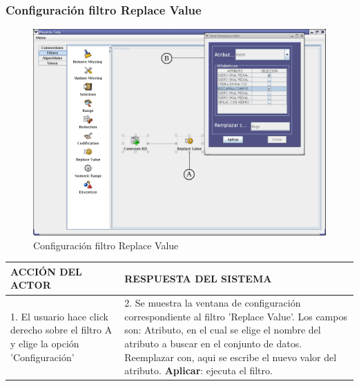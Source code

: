 \subsubsection{Configuraci\'on filtro Replace Value}
\begin{figure}[ht]
\centering
\includegraphics[width=1\textwidth]{images/fi7.png}
\caption{Configuraci\'on filtro Replace Value}
\end{figure}
\begin{center}
\begin{tabular}{|p{60mm}|p{60mm}|} \hline
ACCI\'ON DEL ACTOR & RESPUESTA DEL SISTEMA \\ \hline
1. El usuario hace click derecho sobre el filtro A y elige la opci\'on 'Configuraci\'on'& 2. Se muestra la ventana de configuraci\'on correspondiente al filtro 'Replace Value'. Los campos son: Atributo, en el cual se elige el nombre del atributo a buscar en el conjunto de datos. Reemplazar con, aqui se escribe el nuevo valor del atributo. \textbf{Aplicar}: ejecuta el filtro.  \\ \hline
\end{tabular}
\end{center}

\newpage
